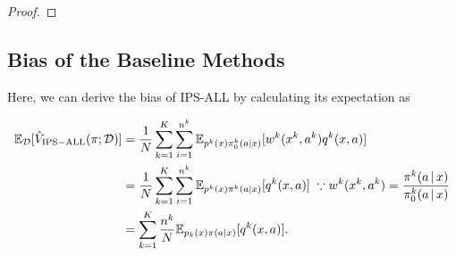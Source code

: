 \begin{proof}
\end{proof}

\subsection{Bias of the Baseline Methods}


Here, we can derive the bias of IPS-ALL by calculating its expectation as

\begin{align*}
\mathbb{E}_{\mathcal{D}} [\hat{V}_{\mathrm{IPS-ALL}}(\pi;\mathcal{D})] 
& = \frac{1}{N}\sum_{k=1}^K\sum_{i=1}^{n^{k}} \mathbb{E}_{p^k(x)\pi_0^k(a|x)} [w^{k}(x^{k},a^{k}) q^k(x,a)] \\
& = \frac{1}{N}\sum_{k=1}^K\sum_{i=1}^{n^{k}} \mathbb{E}_{p^k(x)\pi^k(a|x)} [q^k(x,a)] \; \because w^{k}(x^{k},a^{k}) = \frac{\pi^k(a\,|\,x)}{\pi^k_0(a\,|\,x)} \\
& = \sum_{k=1}^K \frac{n^k}{N} \mathbb{E}_{p_k(x)\pi(a|x)}[q^k(x,a)].
\end{align*}


